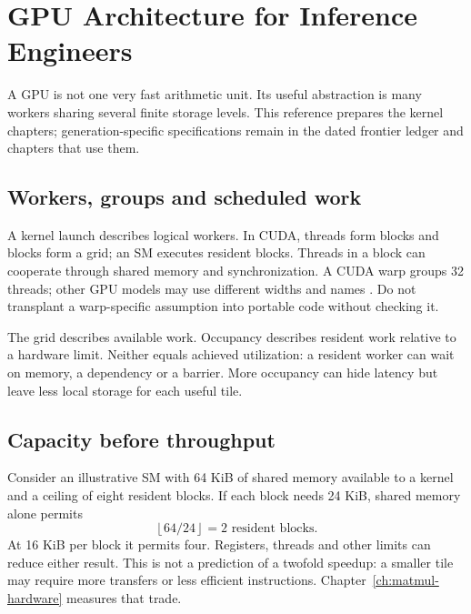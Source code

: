 \chapter{GPU Architecture for Inference Engineers}\label{app:gpu}
\begin{ChapterIntent}
A GPU is not one very fast arithmetic unit. Its useful abstraction is many
workers sharing several finite storage levels. This reference prepares the
kernel chapters; generation-specific specifications remain in the dated
frontier ledger and chapters that use them.
\end{ChapterIntent}

\section{Workers, groups and scheduled work}
A kernel launch describes logical workers. In CUDA, threads form blocks
and blocks form a grid; an SM executes resident blocks. Threads in a block
can cooperate through shared memory and synchronization. A CUDA warp
groups 32 threads; other GPU models may use different widths and names
\cite{nvidia2026programmingmodel}. Do not transplant a warp-specific
assumption into portable code without checking it.

The grid describes available work. Occupancy describes resident work
relative to a hardware limit. Neither equals achieved utilization: a
resident worker can wait on memory, a dependency or a barrier. More
occupancy can hide latency but leave less local storage for each useful tile.

\section{Capacity before throughput}
Consider an illustrative SM with 64 KiB of shared memory available to a
kernel and a ceiling of eight resident blocks. If each block needs 24 KiB,
shared memory alone permits
\[
 \left\lfloor 64/24\right\rfloor=2\text{ resident blocks}.
\]
At 16 KiB per block it permits four. Registers, threads and other limits
can reduce either result. This is not a prediction of a twofold speedup:
a smaller tile may require more transfers or less efficient instructions.
Chapter~\ref{ch:matmul-hardware} measures that trade.


